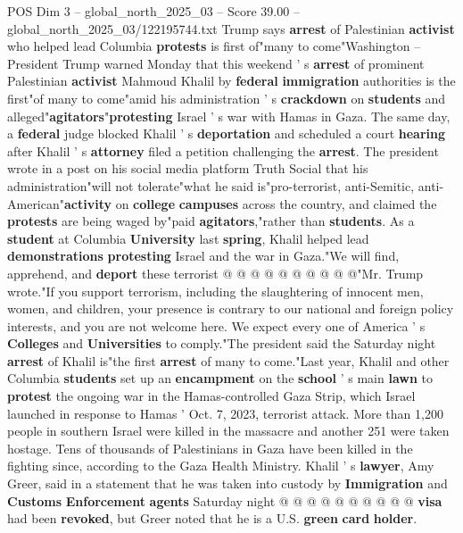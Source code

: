 \begin{textsample}{POS Dim 3 – global\_north\_2025\_03 – Score 39.00 – global\_north\_2025\_03/122195744.txt}  \label{ex:f3_pos_021}
Trump says \textbf{arrest} of Palestinian \textbf{activist} who helped lead Columbia \textbf{protests} is first of"many to come"Washington -- President Trump warned Monday that this weekend ' s \textbf{arrest} of prominent Palestinian \textbf{activist} Mahmoud Khalil by \textbf{federal} \textbf{immigration} authorities is the first"of many to come"amid his administration ' s \textbf{crackdown} on \textbf{students} and alleged"\textbf{agitators}"\textbf{protesting} Israel ' s war with Hamas in Gaza.
The same day, a \textbf{federal} judge blocked Khalil ' s \textbf{deportation} and scheduled a court \textbf{hearing} after Khalil ' s \textbf{attorney} filed a petition challenging the \textbf{arrest}.
The president wrote in a post on his social media platform Truth Social that his administration"will not tolerate"what he said is"pro-terrorist, anti-Semitic, anti-American"\textbf{activity} on \textbf{college} \textbf{campuses} across the country, and claimed the \textbf{protests} are being waged by"paid \textbf{agitators},"rather than \textbf{students}.
As a \textbf{student} at Columbia \textbf{University} last \textbf{spring}, Khalil helped lead \textbf{demonstrations} \textbf{protesting} Israel and the war in Gaza."We will find, apprehend, and \textbf{deport} these terrorist @ @ @ @ @ @ @ @ @ @"Mr.
Trump wrote."If you support terrorism, including the slaughtering of innocent men, women, and children, your presence is contrary to our national and foreign policy interests, and you are not welcome here.
We expect every one of America ' s \textbf{Colleges} and \textbf{Universities} to comply."The president said the Saturday night \textbf{arrest} of Khalil is"the first \textbf{arrest} of many to come."Last year, Khalil and other Columbia \textbf{students} set up an \textbf{encampment} on the \textbf{school} ' s main \textbf{lawn} to \textbf{protest} the ongoing war in the Hamas-controlled Gaza Strip, which Israel launched in response to Hamas ' Oct. 7, 2023, terrorist attack.
More than 1,200 people in southern Israel were killed in the massacre and another 251 were taken hostage.
Tens of thousands of Palestinians in Gaza have been killed in the fighting since, according to the Gaza Health Ministry.
Khalil ' s \textbf{lawyer}, Amy Greer, said in a statement that he was taken into custody by \textbf{Immigration} and \textbf{Customs} \textbf{Enforcement} \textbf{agents} Saturday night @ @ @ @ @ @ @ @ @ @ \textbf{visa} had been \textbf{revoked}, but Greer noted that he is a U.S. \textbf{green} \textbf{card} \textbf{holder}.

\end{textsample}

